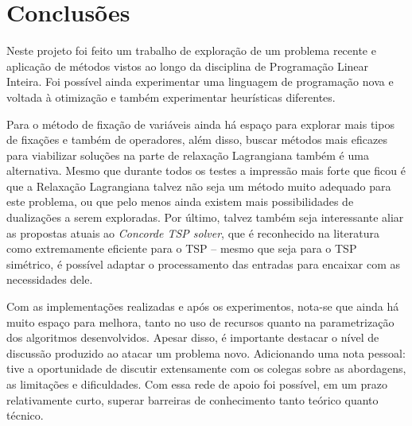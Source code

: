 \chapter{Conclusões}
\label{chap:final_remarks}

\noindent Neste projeto foi feito um trabalho de exploração de um problema recente e aplicação de métodos vistos ao longo da disciplina de Programação Linear Inteira. Foi possível ainda experimentar uma linguagem de programação nova e voltada à otimização e também experimentar heurísticas diferentes.

Para o método de fixação de variáveis ainda há espaço para explorar mais tipos de fixações e também de operadores, além disso, buscar métodos mais eficazes para viabilizar soluções na parte de relaxação Lagrangiana também é uma alternativa. Mesmo que durante todos os testes a impressão mais forte que ficou é que a Relaxação Lagrangiana talvez não seja um método muito adequado para este problema, ou que pelo menos ainda existem mais possibilidades de dualizações a serem exploradas. Por último, talvez também seja interessante aliar as propostas atuais ao \emph{Concorde TSP solver}\cite{ConcordeTSPSolver}, que é reconhecido na literatura como extremamente eficiente para o TSP -- mesmo que seja para o TSP simétrico, é possível adaptar o processamento das entradas para encaixar com as necessidades dele. 

Com as implementações realizadas e após os experimentos, nota-se que ainda há muito espaço para melhora, tanto no uso de recursos quanto na parametrização dos algoritmos desenvolvidos. Apesar disso, é importante destacar o nível de discussão produzido ao atacar um problema novo. Adicionando uma nota pessoal: tive a oportunidade de discutir extensamente com os colegas sobre as abordagens, as limitações e dificuldades. Com essa rede de apoio foi possível, em um prazo relativamente curto, superar barreiras de conhecimento tanto teórico quanto técnico.
